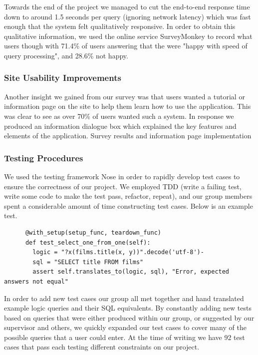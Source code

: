 \documentclass[a4paper, 11pt]{article}
\begin{document}
    Towards the  end of the project we managed to cut the end-to-end response time 
    down to  around 1.5 seconds per query (ignoring network latency) which was 
    fast enough that the system felt qualitatively responsive. In order to obtain 
    this qualitative information, we used the online service SurveyMonkey to record 
    what users though with 71.4\% of users answering that the were "happy with speed
    of query processing", and 28.6\% not happy. 

    \subsubsection{Site Usability Improvements}
    Another insight we gained from our survey was that users wanted a tutorial
    or information page on the site to help them learn how to use the
    application. This was clear to see as over 70\% of users wanted such a
    system. In response we produced an information dialogue box which explained
    the key features and elements of the application.
    Survey results and information page implementation   
    \subsubsection{Testing Procedures}
    We used the testing framework Nose in order to rapidly develop test cases to
    ensure the correctness of our project. We employed TDD (write a failing
    test, write some code to make the test pass, refactor, repeat), and our group 
    members spent a considerable amount of time constructing test cases. Below is an 
    example test.
  
    \begin{verbatim}
      @with_setup(setup_func, teardown_func)
      def test_select_one_from_one(self):
        logic = "?x(films.title(x, y))".decode('utf-8')-
        sql = "SELECT title FROM films"
        assert self.translates_to(logic, sql), "Error, expected answers not equal"
    \end{verbatim}

    In order to add new test cases our group all met together and hand translated 
    example logic queries and their SQL equivalents. By constantly adding new tests 
    based on queries that were either produced within our group, or suggested by our 
    supervisor and others, we quickly expanded our test cases to cover many of the 
    possible queries that a user could enter. At the time of writing we have 92 test 
    cases that pass each testing different constraints on our project.
\end{document}
